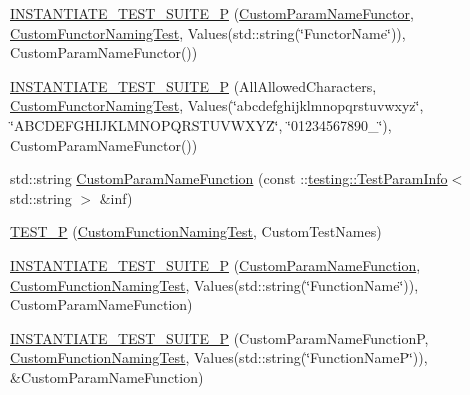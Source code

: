 \begin{DoxyCompactItemize}
\item 
\mbox{\hyperlink{_obj__test_2lib_2googletest-master_2googletest_2test_2googletest-param-test-test_8cc_a3b409037f9d18b063f5fd6c4dacc347d}{I\+N\+S\+T\+A\+N\+T\+I\+A\+T\+E\+\_\+\+T\+E\+S\+T\+\_\+\+S\+U\+I\+T\+E\+\_\+P}} (\mbox{\hyperlink{struct_custom_param_name_functor}{Custom\+Param\+Name\+Functor}}, \mbox{\hyperlink{class_custom_functor_naming_test}{Custom\+Functor\+Naming\+Test}}, Values(std\+::string(\char`\"{}Functor\+Name\char`\"{})), Custom\+Param\+Name\+Functor())
\item 
\mbox{\hyperlink{_obj__test_2lib_2googletest-master_2googletest_2test_2googletest-param-test-test_8cc_a13b1886af30ed49d3501dc5cdc2ea195}{I\+N\+S\+T\+A\+N\+T\+I\+A\+T\+E\+\_\+\+T\+E\+S\+T\+\_\+\+S\+U\+I\+T\+E\+\_\+P}} (All\+Allowed\+Characters, \mbox{\hyperlink{class_custom_functor_naming_test}{Custom\+Functor\+Naming\+Test}}, Values(\char`\"{}abcdefghijklmnopqrstuvwxyz\char`\"{}, \char`\"{}A\+B\+C\+D\+E\+F\+G\+H\+I\+J\+K\+L\+M\+N\+O\+P\+Q\+R\+S\+T\+U\+V\+W\+X\+YZ\char`\"{}, \char`\"{}01234567890\+\_\+\char`\"{}), Custom\+Param\+Name\+Functor())
\item 
std\+::string \mbox{\hyperlink{_obj__test_2lib_2googletest-master_2googletest_2test_2googletest-param-test-test_8cc_a016a6f23e3fe3de5183e5493cf4bcc4f}{Custom\+Param\+Name\+Function}} (const \+::\mbox{\hyperlink{structtesting_1_1_test_param_info}{testing\+::\+Test\+Param\+Info}}$<$ std\+::string $>$ \&inf)
\item 
\mbox{\hyperlink{_obj__test_2lib_2googletest-master_2googletest_2test_2googletest-param-test-test_8cc_a72ff5cb3613a060e1a62f14fa3fa1b52}{T\+E\+S\+T\+\_\+P}} (\mbox{\hyperlink{class_custom_function_naming_test}{Custom\+Function\+Naming\+Test}}, Custom\+Test\+Names)
\item 
\mbox{\hyperlink{_obj__test_2lib_2googletest-master_2googletest_2test_2googletest-param-test-test_8cc_a07a54a2169754db4a7b3923ce3b004c4}{I\+N\+S\+T\+A\+N\+T\+I\+A\+T\+E\+\_\+\+T\+E\+S\+T\+\_\+\+S\+U\+I\+T\+E\+\_\+P}} (\mbox{\hyperlink{_obj__test_2lib_2googletest-release-1_88_81_2googletest_2test_2googletest-param-test-test_8cc_a016a6f23e3fe3de5183e5493cf4bcc4f}{Custom\+Param\+Name\+Function}}, \mbox{\hyperlink{class_custom_function_naming_test}{Custom\+Function\+Naming\+Test}}, Values(std\+::string(\char`\"{}Function\+Name\char`\"{})), Custom\+Param\+Name\+Function)
\item 
\mbox{\hyperlink{_obj__test_2lib_2googletest-master_2googletest_2test_2googletest-param-test-test_8cc_a1a12716f19b207a803949487ced6f798}{I\+N\+S\+T\+A\+N\+T\+I\+A\+T\+E\+\_\+\+T\+E\+S\+T\+\_\+\+S\+U\+I\+T\+E\+\_\+P}} (Custom\+Param\+Name\+FunctionP, \mbox{\hyperlink{class_custom_function_naming_test}{Custom\+Function\+Naming\+Test}}, Values(std\+::string(\char`\"{}Function\+NameP\char`\"{})), \&Custom\+Param\+Name\+Function)

\end{DoxyCompactItemize}

